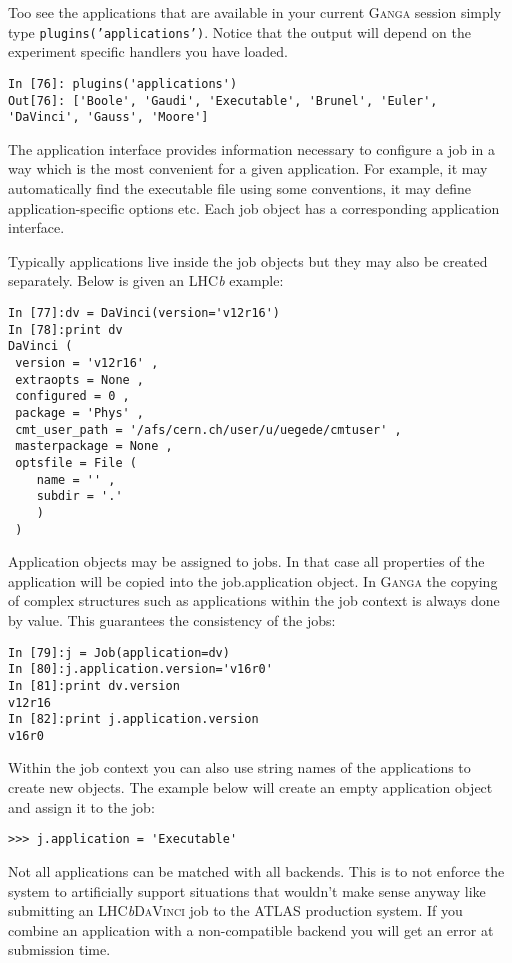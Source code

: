 \documentclass{howto}
\def\ganga {\textsc{Ganga}\xspace}
\def\lhcb {LHC{\em b\/}\xspace}
\def\davinci {\textsc{DaVinci}\xspace}
\begin{document}
Too see the applications that are available in your current \ganga session
simply type \texttt{plugins('applications')}. Notice that the output will depend on the
experiment specific handlers you have loaded.
\begin{verbatim}
In [76]: plugins('applications')
Out[76]: ['Boole', 'Gaudi', 'Executable', 'Brunel', 'Euler', 'DaVinci', 'Gauss', 'Moore']
\end{verbatim}

The application interface provides information necessary to configure a job in
a way which is the most convenient for a given application. For example, it may
automatically find the executable file using some conventions, it may define
application-specific options etc.  Each job object has a corresponding
application interface.

Typically applications live inside the job objects but they may also be
created separately. Below is given an \lhcb example:
\begin{verbatim}
In [77]:dv = DaVinci(version='v12r16')
In [78]:print dv
DaVinci (
 version = 'v12r16' ,
 extraopts = None ,
 configured = 0 ,
 package = 'Phys' ,
 cmt_user_path = '/afs/cern.ch/user/u/uegede/cmtuser' ,
 masterpackage = None ,
 optsfile = File (
    name = '' ,
    subdir = '.' 
    ) 
 ) 
\end{verbatim}

Application objects may be assigned to jobs.  In that case all properties of
the application will be copied into the job.application object. In \ganga the
copying of complex structures such as applications within the job context is
always done by value. This guarantees the consistency of the jobs:
\begin{verbatim}
In [79]:j = Job(application=dv)
In [80]:j.application.version='v16r0'
In [81]:print dv.version
v12r16
In [82]:print j.application.version
v16r0
\end{verbatim}

Within the job context you can also use string names of the applications to
create new objects. The example below will create an empty
 application object and assign it to the job:
\begin{verbatim}
>>> j.application = 'Executable'
\end{verbatim}

\begin{notice}
  Not all applications can be matched with all backends. This is to not
  enforce the system to artificially support situations that wouldn't make
  sense anyway like submitting an \lhcb \davinci job to the ATLAS production
  system. If you combine an application with a non-compatible backend you will
  get an error at submission time.
\end{notice}
\end{document}
